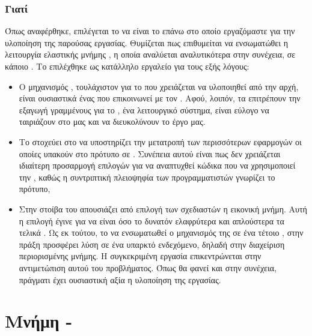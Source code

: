 \subsubsection{Γιατί }

Όπως αναφέρθηκε, επιλέγεται το  να είναι το 
επάνω στο οποίο εργαζόμαστε για την υλοποίηση της παρούσας
εργασίας. Θυμίζεται πως επιθυμείται να ενσωματώθει η λειτουργία
ελαστικής μνήμης , η οποία αναλύεται αναλυτικότερα στην
συνέχεια, σε κάποιο . Το 
επιλέχθηκε ως κατάλληλο εργαλείο για τους εξής λόγους:

\begin{itemize}
  \item Ο μηχανισμός , τουλάχιστον για το 
  που χρειάζεται να υλοποιηθεί από την αρχή, είναι ουσιαστικά ένας 
  που επικοινωνεί με τον . Αφού, λοιπόν, τα 
  επιτρέπουν την εξαγωγή  γραμμένους για το , ένα
   λειτουργικό σύστημα, είναι εύλογο να ταιριάζουν
  στο  μας και να διευκολύνουν το έργο μας.

  \item Το  στοχεύει στο να υποστηρίζει την
  μετατροπή των περισσότερων εφαρμογών οι οποίες υπακούν στο
    πρότυπο σε . Συνέπεια αυτού είναι πως δεν
   χρειάζεται ιδιαίτερη προσαρμογή επιλογών για να αναπτυχθεί 
   κώδικα που να χρησιμοποιεί την , καθώς η συντριπτική πλειοψηφία των
   προγραμματιστών γνωρίζει το  πρότυπο,

  \item Στην στοίβα του  απουσιάζει από
  επιλογή των σχεδιαστών η εικονική μνήμη. Αυτή η επιλογή
  έγινε για να είναι όσο το δυνατόν ελαφρύτερα και απλούστερα
  τα τελικά . Ως εκ τούτου, το να ενσωματωθεί ο
  μηχανισμός της  σε ένα τέτοιο ,
  στην πράξη προσφέρει λύση σε ένα υπαρκτό ενδεχόμενο,
  δηλαδή στην διαχείριση περιορισμένης μνήμης. Η συγκεκριμένη εργασία
  επικεντρώνεται στην αντιμετώπιση αυτού του προβλήματος. Όπως θα
  φανεί και στην συνέχεια, πράγματι έχει ουσιαστική αξία η
  υλοποίηση της εργασίας.

\end{itemize}







\section{Μνήμη - }

